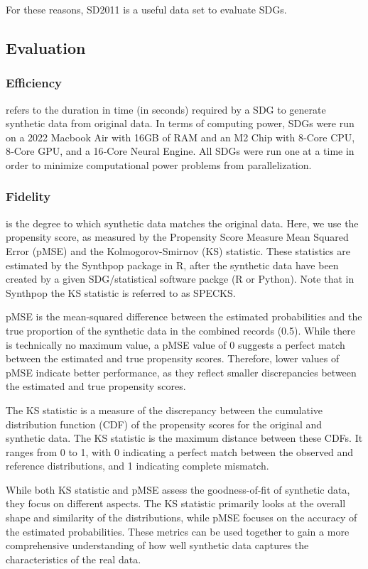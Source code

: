 \documentclass[runningheads]{llncs}
\begin{document}
For these reasons, SD2011 is a useful data set to evaluate SDGs.  

\subsection{Evaluation}

\subsubsection{Efficiency} refers to the duration in time (in seconds) required by a SDG to generate synthetic data from original data.  In terms of computing power, SDGs were run on a 2022 Macbook Air with 16GB of RAM and an M2 Chip with 8‑Core CPU, 8‑Core GPU, and a 16‑Core Neural Engine.  All SDGs were run one at a time in order to minimize computational power problems from parallelization.

\subsubsection{Fidelity} is the degree to which synthetic data matches the original data.  Here, we use the propensity score, as measured by the Propensity Score Measure Mean Squared Error (pMSE) and the Kolmogorov-Smirnov (KS) statistic.  These statistics are estimated by the Synthpop package in R, after the synthetic data have been created by a given SDG/statistical software packge (R or Python).  Note that in Synthpop the KS statistic is referred to as SPECKS. 

pMSE is the mean-squared difference between the estimated probabilities and the true proportion of the synthetic data in the combined records (0.5).  While there is technically no maximum value, a pMSE value of 0 suggests a perfect match between the estimated and true propensity scores.  Therefore, lower values of pMSE indicate better performance, as they reflect smaller discrepancies between the estimated and true propensity scores.  

The KS statistic is a measure of the discrepancy between the cumulative distribution function (CDF) of the propensity scores for the original and synthetic data.  The KS statistic is the maximum distance between these CDFs. It ranges from 0 to 1, with 0 indicating a perfect match between the observed and reference distributions, and 1 indicating complete mismatch.  

While both KS statistic and pMSE assess the goodness-of-fit of synthetic data, they focus on different aspects. The KS statistic primarily looks at the overall shape and similarity of the distributions, while pMSE focuses on the accuracy of the estimated probabilities. These metrics can be used together to gain a more comprehensive understanding of how well synthetic data captures the characteristics of the real data.
\end{document}
